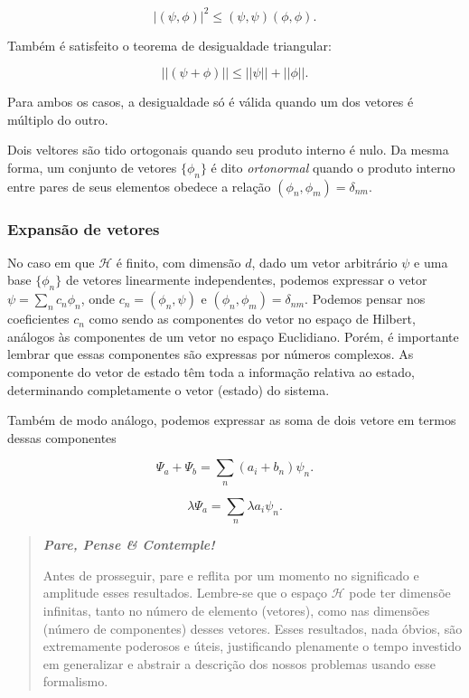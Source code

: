 \documentclass[11pt]{article}
\begin{document}
\[ |(\psi,\phi)|^2 \le (\psi,\psi)(\phi,\phi).\]

Também é satisfeito o teorema de desigualdade triangular:

\[ ||(\psi + \phi)|| \le ||\psi|| + ||\phi|| .\]

Para ambos os casos, a desigualdade só é válida quando um dos vetores é
múltiplo do outro.

Dois veltores são tido ortogonais quando seu produto interno é nulo. Da
mesma forma, um conjunto de vetores \(\{\phi_n\}\) é dito
\emph{ortonormal} quando o produto interno entre pares de seus elementos
obedece a relação \((\phi_n,\phi_m)=\delta_{nm}\).

    \hypertarget{expansuxe3o-de-vetores}{%
\subsubsection{Expansão de vetores}\label{expansuxe3o-de-vetores}}

No caso em que \(\mathcal{H}\) é finito, com dimensão \(d\), dado um
vetor arbitrário \(\psi\) e uma base \(\{ \phi_n \}\) de vetores
linearmente independentes, podemos expressar o vetor
\(\psi = \sum_n c_n \phi_n\), onde \(c_n=(\phi_n,\psi)\) e
\((\phi_n,\phi_m)=\delta_{nm}\). Podemos pensar nos coeficientes \(c_n\)
como sendo as componentes do vetor no espaço de Hilbert, análogos às
componentes de um vetor no espaço Euclidiano. Porém, é importante
lembrar que essas componentes são expressas por números complexos. As
componente do vetor de estado têm toda a informação relativa ao estado,
determinando completamente o vetor (estado) do sistema.

Também de modo análogo, podemos expressar as soma de dois vetore em
termos dessas componentes

\[\Psi_a + \Psi_b = \sum_n (a_i + b_n) \psi_n.\]

\[\lambda \Psi_a= \sum_n \lambda a_i \psi_n.\]

    \begin{quote}
\textbf{\emph{Pare, Pense \& Contemple!}}

Antes de prosseguir, pare e reflita por um momento no significado e
amplitude esses resultados. Lembre-se que o espaço \(\mathcal{H}\) pode
ter dimensõe infinitas, tanto no número de elemento (vetores), como nas
dimensões (número de componentes) desses vetores. Esses resultados, nada
óbvios, são extremamente poderosos e úteis, justificando plenamente o
tempo investido em generalizar e abstrair a descrição dos nossos
problemas usando esse formalismo.
\end{quote}
\end{document}
